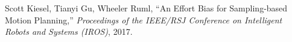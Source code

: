 \documentclass[margin, 10pt]{res} %
\begin{document}
\begin{resume}
Scott Kiesel, Tianyi Gu, Wheeler Ruml, ``An Effort Bias for
Sampling-based Motion Planning,'' {\sl Proceedings of the IEEE/RSJ Conference on
  Intelligent Robots and Systems (IROS)}, 2017.\\~\\

\end{resume}
\end{document}
